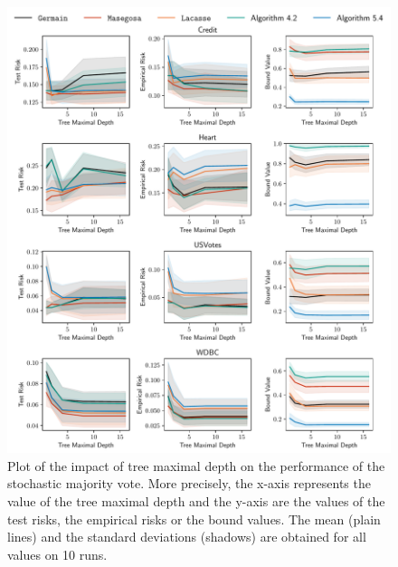 \begin{noaddcontents}
\begin{figure}
    \centering
    \includegraphics[width=\textwidth]{chapter_5/figures/depth_1.pdf}
    \caption{
    Plot of the impact of tree maximal depth on the performance of the stochastic majority vote.
    More precisely, the x-axis represents the value of the tree maximal depth and the y-axis are the values of the test risks, the empirical risks or the bound values.
    The mean (plain lines) and the standard deviations (shadows) are obtained for all values on 10 runs.
    }
    \label{ap:mv-sto:fig:depth-1}
\end{figure}


\end{noaddcontents}
